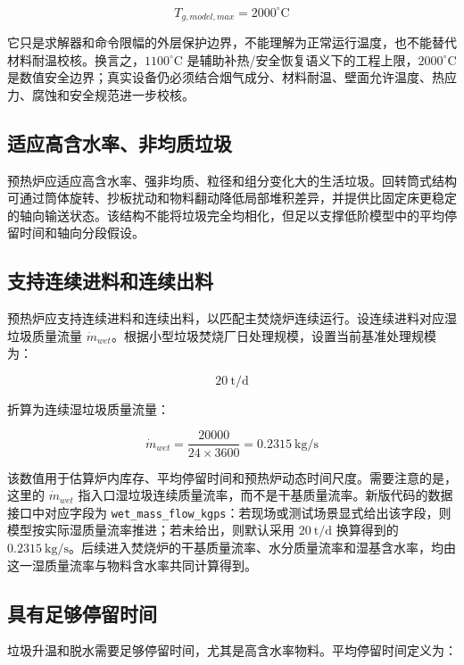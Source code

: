 \documentclass[UTF8,openany,zihao=-4,oneside]{ctexbook}
\begin{document}
\[
T_{g,model,max}=2000^\circ\mathrm{C}
\]

它只是求解器和命令限幅的外层保护边界，不能理解为正常运行温度，也不能替代材料耐温校核。换言之，\(1100^\circ\mathrm{C}\) 是辅助补热/安全恢复语义下的工程上限，\(2000^\circ\mathrm{C}\) 是数值安全边界；真实设备仍必须结合烟气成分、材料耐温、壁面允许温度、热应力、腐蚀和安全规范进一步校核。

\subsection{适应高含水率、非均质垃圾}\label{ux9002ux5e94ux9ad8ux542bux6c34ux7387ux975eux5747ux8d28ux5783ux573e}

预热炉应适应高含水率、强非均质、粒径和组分变化大的生活垃圾。回转筒式结构可通过筒体旋转、抄板扰动和物料翻动降低局部堆积差异，并提供比固定床更稳定的轴向输送状态。该结构不能将垃圾完全均相化，但足以支撑低阶模型中的平均停留时间和轴向分段假设。

\subsection{支持连续进料和连续出料}\label{ux652fux6301ux8fdeux7eedux8fdbux6599ux548cux8fdeux7eedux51faux6599}

预热炉应支持连续进料和连续出料，以匹配主焚烧炉连续运行。设连续进料对应湿垃圾质量流量 \(\dot m_{wet}\)。根据小型垃圾焚烧厂日处理规模，设置当前基准处理规模为：

\[
20\ \mathrm{t/d}
\]

折算为连续湿垃圾质量流量：

\[
\dot m_{wet}=\frac{20000}{24\times3600}=0.2315\ \mathrm{kg/s}
\]

该数值用于估算炉内库存、平均停留时间和预热炉动态时间尺度。需要注意的是，这里的 \(\dot m_{wet}\) 指入口湿垃圾连续质量流率，而不是干基质量流率。新版代码的数据接口中对应字段为 \texttt{wet\_mass\_flow\_kgps}：若现场或测试场景显式给出该字段，则模型按实际湿质量流率推进；若未给出，则默认采用 \(20\ \mathrm{t/d}\) 换算得到的 \(0.2315\ \mathrm{kg/s}\)。后续进入焚烧炉的干基质量流率、水分质量流率和湿基含水率，均由这一湿质量流率与物料含水率共同计算得到。

\subsection{具有足够停留时间}\label{ux5177ux6709ux8db3ux591fux505cux7559ux65f6ux95f4}

垃圾升温和脱水需要足够停留时间，尤其是高含水率物料。平均停留时间定义为：
\end{document}
